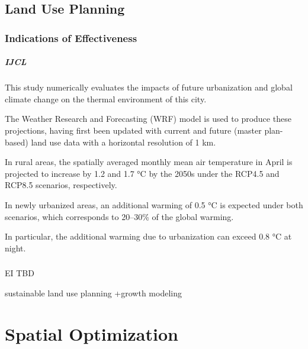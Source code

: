 \documentclass[12pt]{caltech_thesis}
\begin{document}
\section{Land Use Planning}
\begin{bibunit}

\subsection{Indications of Effectiveness}
\paragraph{\citep{Doan2018} IJCL}
This study numerically evaluates the impacts of future urbanization and global climate change on the thermal environment of this city.

The Weather Research and Forecasting (WRF) model is used to produce these projections, having first been updated with current and future (master plan-based) land use data with a horizontal resolution of 1 km.

In rural areas, the spatially averaged monthly mean air temperature in April is projected to increase by 1.2 and 1.7 °C by the 2050s under the RCP4.5 and RCP8.5 scenarios, respectively. 

In newly urbanized areas, an additional warming of 0.5 °C is expected under both scenarios, which corresponds to 20–30\% of the global warming. 

In particular, the additional warming due to urbanization can exceed 0.8 °C at night. 


\subsection{}

\citep{Xu2019} EI TBD

\citep{Huang2014}
sustainable land use planning
+growth modeling


\renewcommand{\bibsection}{\section*{\refname}}
\putbib[ownpubs]  %
\end{bibunit}


\chapter{Spatial Optimization}
\end{document}
